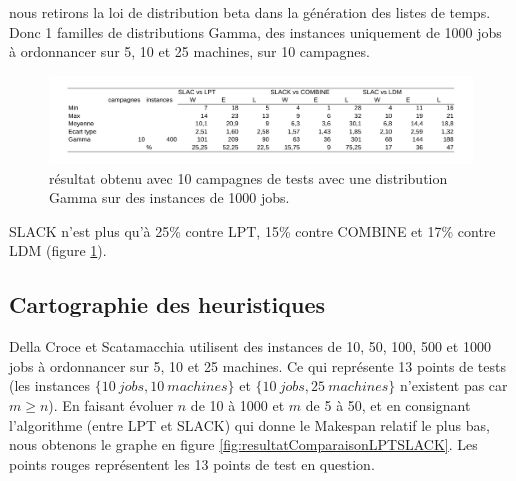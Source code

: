 \documentclass[a4paper,12pt]{report}
\theoremstyle{plain}				%
\theoremstyle{definition}				%
\begin{document}
\bigskip
nous retirons la loi de distribution beta dans la génération des listes de temps.
Donc 1 familles de distributions Gamma, 
  des instances uniquement de 1000 jobs à ordonnancer sur 5, 10 et 25 machines,
  sur 10 campagnes.

\begin{figure}
{\centering
\includegraphics[width=\columnwidth]{7_Resultat_Reproduction10Gamma1000.pdf}
\caption{résultat obtenu avec 10 campagnes de tests avec une distribution Gamma sur des instances de 1000 jobs.}
\label{fig:resultatReproduction10Gamma1000}
\par}
\end{figure}

SLACK n'est plus qu'à 25\% contre LPT, 15\% contre COMBINE et 17\% contre LDM (figure \ref{fig:resultatReproduction10Gamma1000}).


\subsection{Cartographie des heuristiques}
\label{ssec:resultatsCartographie}

Della Croce et Scatamacchia utilisent des instances de 10, 50, 100, 500 et 1000 jobs à ordonnancer sur 5, 10 et 25 machines. 
Ce qui représente 13 points de tests 
  (les instances 
  $\{10~jobs,10~machines\}$ et 
  $\{10~jobs,25~machines\}$ n'existent pas car $m\geq n$).
En faisant évoluer $n$ de 10 à 1000 et $m$ de 5 à 50, 
  et en consignant l'algorithme (entre LPT et SLACK) qui donne 
  le Makespan relatif le plus bas, nous obtenons le graphe en figure \ref{fig:resultatComparaisonLPTSLACK}.
Les points rouges représentent les 13 points de test en question.
\end{document}

